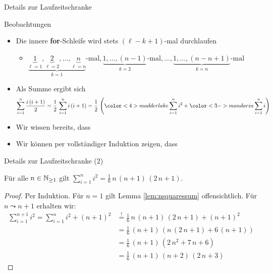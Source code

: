\begin{frame}{Details zur Laufzeitschranke}
    \begin{block}{Beobachtungen}
        \begin{itemize}
            \item<+-> Die innere \textbf{for}-Schleife wird stets $(\ell - k + 1)$-mal durchlaufen
            \begin{itemize}
                \item $\underbrace{\underbrace{1}_{\ell=1}, \underbrace{2}_{\ell=2}, \dots, \underbrace{n}_{\ell=n}}_{k=1}\text{-mal}, \underbrace{1, \dots, (n-1)}_{k=2}\text{-mal}, \dots, \underbrace{1, \dots, (n-n+1)}_{k=n}\text{-mal}$
            \end{itemize}
            \item<+-> Als Summe ergibt sich $$\sum_{i=1}^n \frac{i \, (i+1)}{2} = \frac{1}{2} \, \sum_{i=1}^n i \, (i+1) = \frac{1}{2} \, \left({\color<4>{madderlake} \sum_{i=1}^n i^2} + {\color<3->{mandarin} \sum_{i=1}^n i} \right)$$
            \item<+-> Wir wissen bereits, dass 
            \item<+-> Wir k\"onnen per vollst\"andiger Induktion zeigen, dass 
        \end{itemize}
    \end{block}
\end{frame}

\begin{frame}{Details zur Laufzeitschranke (2)}
    \begin{lemma}\label{lem:nsquaressum}
    F\"ur alle $n \in \mathbb{N}_{\geq 1}$ gilt $\sum_{i=1}^n i^2 = \frac{1}{6} \, n \, (n + 1) \, (2 \, n + 1)$.
    \end{lemma}
    
    \begin{proof}
    Per Induktion.
    F\"ur $n=1$ gilt Lemma \ref{lem:nsquaressum} offensichtlich.
    F\"ur $n \leadsto n+1$ erhalten wir:
    \begin{align*}
        \sum_{i=1}^{n+1} i^2 = \sum_{i=1}^{n} i^2 + (n+1)^2 &\overset{!}{=} \frac{1}{6} \, n \, (n + 1) \, (2 \, n + 1) + (n+1)^2 \\
        &= \frac{1}{6} \, (n + 1) \, (n \, (2 \, n + 1) + 6 \, (n+1)) \\
        &= \frac{1}{6} \, (n + 1) \, (2 \, n^2 + 7 \, n + 6) \\
        &= \frac{1}{6} \, (n + 1) \, (n + 2) \, (2 \, n + 3)
    \end{align*}
    \end{proof}
\end{frame}

